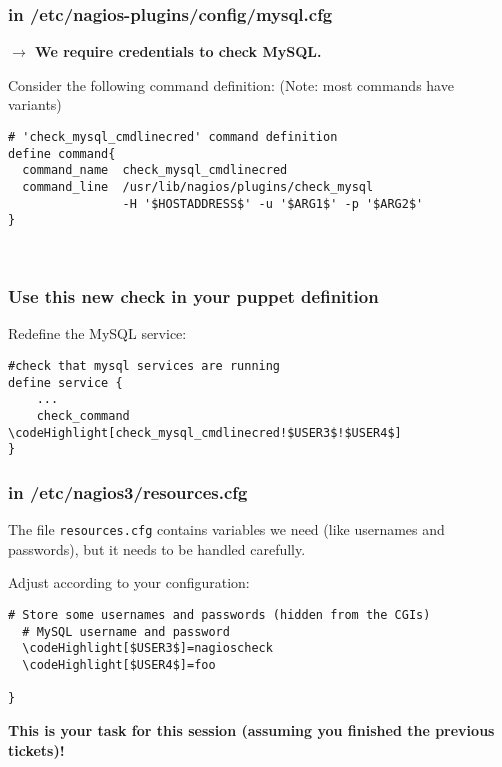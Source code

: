 \documentclass[10pt]{beamer}
\newcommand\codeHighlight[1]{\textcolor[rgb]{1,0,0}{\textbf{#1}}}
\begin{document}
\begin{frame}[fragile]
  \frametitle{in /etc/nagios-plugins/config/mysql.cfg}

\textbf{$\rightarrow$ We require credentials to check MySQL.}

\vspace{0.5cm}
Consider the following command definition: (Note: most commands have variants)
\vspace{0.5cm}

\begin{Verbatim}[commandchars=\\\[\]]
# 'check_mysql_cmdlinecred' command definition
define command{
  command_name  check_mysql_cmdlinecred
  command_line  /usr/lib/nagios/plugins/check_mysql
                -H '$HOSTADDRESS$' -u '$ARG1$' -p '$ARG2$'
}



\end{Verbatim}
\end{frame}
\begin{frame}[fragile]
  \frametitle{Use this new check in your puppet definition}

Redefine the MySQL service:

\vspace{0.5cm}

\begin{Verbatim}[commandchars=\\\[\]]
#check that mysql services are running
define service {
	...
    check_command    \codeHighlight[check_mysql_cmdlinecred!$USER3$!$USER4$]
}

\end{Verbatim}
\end{frame}

\begin{frame}[fragile]
  \frametitle{in /etc/nagios3/resources.cfg}

The file {\tt resources.cfg} contains variables we need (like usernames and passwords), but it needs to be handled carefully. 

Adjust according to your configuration:

\vspace{0.5cm}

\begin{Verbatim}[commandchars=\\\[\]]
  # Store some usernames and passwords (hidden from the CGIs)
  # MySQL username and password
  \codeHighlight[$USER3$]=nagioscheck
  \codeHighlight[$USER4$]=foo

}
\end{Verbatim}


\vspace{0.5cm}

\textbf{This is your task for this session (assuming you finished the previous tickets)!}

\end{frame}
\end{document}
